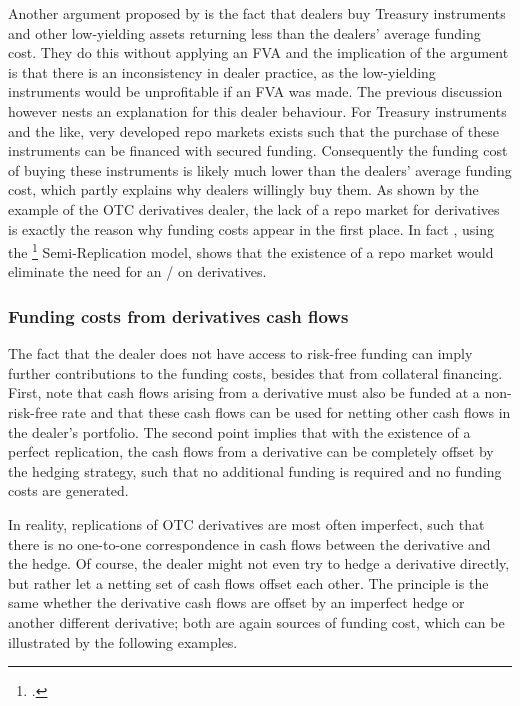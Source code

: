 \documentclass[main.tex]{subfiles}
\begin{document}
        Another argument proposed by \textcite{HullWhite2012FVA} is the fact that dealers buy Treasury instruments and other low-yielding assets returning less than the dealers' average funding cost.
        They do this without applying an FVA and the implication of the argument is that there is an inconsistency in dealer practice,
        as the low-yielding instruments would be unprofitable if an FVA was made.
        The previous discussion however nests an explanation for this dealer behaviour.
        For Treasury instruments and the like,
        very developed repo markets exists such that the purchase of these instruments can be financed with secured funding.
        Consequently the funding cost of buying these instruments is likely much lower than the dealers' average funding cost,
        which partly explains why dealers willingly buy them.
        As shown by the example of the OTC derivatives dealer, 
        the lack of a repo market for derivatives is exactly the reason why funding costs appear in the first place.
        In fact \textcite[Section~9.4.1]{Green2015XVA}, 
        using the \footcite{BurgardKjaer2013Funding} Semi-Replication model,
        shows that the existence of a repo market would eliminate the need for an \FVA/ on derivatives. 
        
    \subsubsection{Funding costs from derivatives cash flows}
        The fact that the dealer does not have access to risk-free funding
        can imply further contributions to the funding costs, besides that from collateral financing.
        First, note that cash flows arising from a derivative must also be funded at a non-risk-free rate
        and that these cash flows can be used for netting other cash flows in the dealer's portfolio.
        The second point implies that with the existence of a perfect replication,
        the cash flows from a derivative can be completely offset by the hedging strategy,
        such that no additional funding is required and no funding costs are generated.

        In reality, replications of OTC derivatives are most often imperfect,
        such that there is no one-to-one correspondence in cash flows between the derivative and the hedge.
        Of course, the dealer might not even try to hedge a derivative directly,
        but rather let a netting set of cash flows offset each other. 
        The principle is the same whether the derivative cash flows are offset by an imperfect hedge
        or another different derivative;
        both are again sources of funding cost, which can be illustrated by the following examples.
\end{document}
